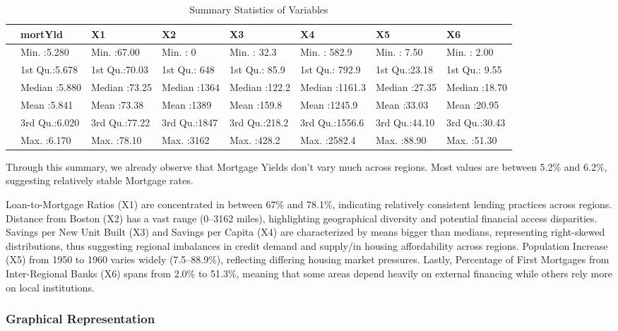 \documentclass[
  11pt,
]{article}
\begin{document}
\begin{longtable}[t]{llllllll}
\caption{\label{tab:unnamed-chunk-3}Summary Statistics of Variables}\\
\toprule
 & mortYld & X1 & X2 & X3 & X4 & X5 & X6\\
\midrule
 & Min.   :5.280 & Min.   :67.00 & Min.   :   0 & Min.   : 32.3 & Min.   : 582.9 & Min.   : 7.50 & Min.   : 2.00\\
 & 1st Qu.:5.678 & 1st Qu.:70.03 & 1st Qu.: 648 & 1st Qu.: 85.9 & 1st Qu.: 792.9 & 1st Qu.:23.18 & 1st Qu.: 9.55\\
 & Median :5.880 & Median :73.25 & Median :1364 & Median :122.2 & Median :1161.3 & Median :27.35 & Median :18.70\\
 & Mean   :5.841 & Mean   :73.38 & Mean   :1389 & Mean   :159.8 & Mean   :1245.9 & Mean   :33.03 & Mean   :20.95\\
 & 3rd Qu.:6.020 & 3rd Qu.:77.22 & 3rd Qu.:1847 & 3rd Qu.:218.2 & 3rd Qu.:1556.6 & 3rd Qu.:44.10 & 3rd Qu.:30.43\\
\addlinespace
 & Max.   :6.170 & Max.   :78.10 & Max.   :3162 & Max.   :428.2 & Max.   :2582.4 & Max.   :88.90 & Max.   :51.30\\
\bottomrule
\end{longtable}
\endgroup{}

Through this summary, we already observe that Mortgage Yields don't vary
much across regions. Most values are between 5.2\% and 6.2\%, suggesting
relatively stable Mortgage rates.

Loan-to-Mortgage Ratios (X1) are concentrated in between 67\% and
78.1\%, indicating relatively consistent lending practices across
regions. Distance from Boston (X2) has a vast range (0--3162 miles),
highlighting geographical diversity and potential financial access
disparities. Savings per New Unit Built (X3) and Savings per Capita (X4)
are characterized by means bigger than medians, representing
right-skewed distributions, thus suggesting regional imbalances in
credit demand and supply/in housing affordability across regions.
Population Increase (X5) from 1950 to 1960 varies widely (7.5--88.9\%),
reflecting differing housing market pressures. Lastly, Percentage of
First Mortgages from Inter-Regional Banks (X6) spans from 2.0\% to
51.3\%, meaning that some areas depend heavily on external financing
while others rely more on local institutions.

\subsubsection{Graphical Representation}\label{graphical-representation}
\end{document}
